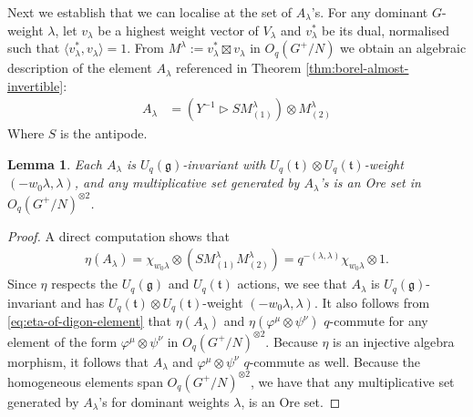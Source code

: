\documentclass[a4paper]{article}
\numberwithin{equation}{section}
\newtheorem{lemma}[counter]{Lemma}
\newcommand{\1}{{\mathrm{1}\mkern-4mu{\mathchoice{}{}{\mskip-0.5mu}{\mskip-1mu}}\mathrm{l}}}
\renewcommand{\t}{\mathfrak{t}}
\newcommand{\g}{\mathfrak{g}}
\begin{document}
Next we establish that we can localise at the set of $A_\lambda$'s. For any dominant $G$-weight $\lambda$, let $v_\lambda$ be a highest weight vector of $V_\lambda$ and $v_\lambda^*$ be its dual, normalised such that $\langle v_\lambda^*,v_\lambda\rangle = 1$.
From $M^\lambda := v_\lambda^* \boxtimes v_\lambda$ in $O_q(G^+/N)$ we obtain an algebraic description of the element $A_\lambda$ referenced in Theorem \ref{thm:borel-almost-invertible}:
\begin{equation}\label{eq:digon-coordinate}
    \begin{aligned}
    A_\lambda &= (Y^{-1}\rhd SM^{\lambda}_{(1)})\otimes M^\lambda_{(2)}
\end{aligned}
\end{equation}
Where $S$ is the antipode.
\begin{lemma}\label{lemma:Alambda-good-properties}
    Each $A_\lambda$ is $U_q(\g)$-invariant with $U_q(\t)\otimes U_q(\t)$-weight $(-w_0\lambda,
    \lambda)$, and any multiplicative set generated by $A_\lambda$'s is an Ore set in $O_q(G^+/N)^{\otimes 2}$.
\end{lemma}
\begin{proof}
    A direct computation shows that
\begin{align}\label{eq:eta-of-digon-element}
    \eta(A_\lambda) = \chi_{w_0\lambda} \otimes (SM^{\lambda}_{(1)}M^\lambda_{(2)}) = q^{-(\lambda,\lambda)}\chi_{w_0\lambda} \otimes 1.
\end{align}
Since $\eta$ respects the $U_q(\mathfrak{g})$ and $U_q(\mathfrak{t})$ actions, we see that $A_\lambda$ is $U_q(\g)$-invariant and has $U_q(\t) \otimes U_q(\t)$-weight $(-w_0\lambda,\lambda)$.
It also follows from \eqref{eq:eta-of-digon-element} that $\eta(A_\lambda)$ and $\eta(\varphi^\mu\otimes \psi^\nu)$ $q$-commute for any element of the form $\varphi^\mu\otimes \psi^\nu$ in $O_q(G^+/N)^{\otimes 2}$. Because $\eta$ is an injective algebra morphism, it follows that $A_\lambda$ and $\varphi^\mu\otimes \psi^\nu$ $q$-commute as well. Because the homogeneous elements span $O_q(G^+/N)^{\otimes 2}$, we have that any multiplicative set generated by $A_\lambda$'s for dominant weights $\lambda$, is an Ore set. 
\end{proof}
\end{document}
